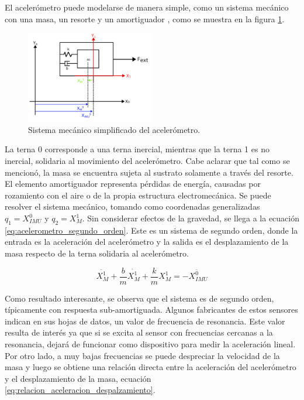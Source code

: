 El acelerómetro puede modelarse de manera simple, como un sistema mecánico con una masa, un resorte y un amortiguador \cite{zhang2010sensing}, como se muestra en la figura \ref{fig:acelerometro_modelo}.

\begin{figure}[H]
    \centering
    \includegraphics[width=0.5\textwidth]{img/acelerometro_modelo.png}
    \caption{Sistema mecánico simplificado del acelerómetro.}
    \label{fig:acelerometro_modelo}    
\end{figure}

La terna 0 corresponde a una terna inercial, mientras que la terna 1 es no inercial, solidaria al movimiento del acelerómetro. Cabe aclarar que tal como se mencionó, la masa se encuentra sujeta al sustrato solamente a través del resorte. El elemento amortiguador representa pérdidas de energía, causadas por rozamiento con el aire o de la propia estructura electromecánica. Se puede resolver el sistema mecánico, tomando como coordenadas generalizadas $q_1 = X_{IMU}^0$ y $q_2 = X_M^1$. Sin considerar efectos de la gravedad, se llega a la ecuación \eqref{eq:acelerometro_segundo_orden}. Este es un sistema de segundo orden, donde la entrada es la aceleración del acelerómetro y la salida es el desplazamiento de la masa respecto de la terna solidaria al acelerómetro. 

\begin{equation}
    \ddot{X_M^1} + \frac{b}{m} \dot{X_M^1} + \frac{k}{m} X_M^1 = -\ddot{X_{IMU}^0}
    \label{eq:acelerometro_segundo_orden}
\end{equation}

Como resultado interesante, se observa que el sistema es de segundo orden, típicamente con respuesta sub-amortiguada. Algunos fabricantes de estos sensores indican en sus hojas de datos, un valor de frecuencia de resonancia. Este valor resulta de interés ya que si se excita al sensor con frecuencias cercanas a la resonancia, dejará de funcionar como dispositivo para medir la aceleración lineal. Por otro lado, a muy bajas frecuencias se puede despreciar la velocidad de la masa y luego se obtiene una relación directa entre la aceleración del acelerómetro y el desplazamiento de la masa, ecuación \eqref{eq:relacion_aceleracion_despalzamiento}.

